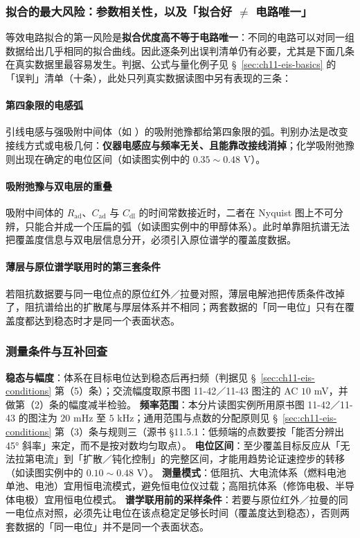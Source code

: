\subsubsection{拟合的最大风险：参数相关性，以及「拟合好 $\neq$ 电路唯一」}

等效电路拟合的第一风险是\textbf{拟合优度高不等于电路唯一}：不同的电路可以对同一组数据给出几乎相同的拟合曲线。因此逐条列出误判清单仍有必要，尤其是下面几条在真实数据里最容易发生。判据、公式与量化例子见 §~\ref{sec:ch11-eis-basics} 的「误判」清单（十条），此处只列真实数据读图中另有表现的三条：

\paragraph{第四象限的电感弧}引线电感与强吸附中间体（如 ）的吸附弛豫都给第四象限的弧。判别办法是改变接线方式或电极几何：\textbf{仪器电感应与频率无关、且能靠改接线消掉}；化学吸附弛豫则出现在确定的电位区间（如读图实例中的 $0.35\sim0.48$ V）。
\paragraph{吸附弛豫与双电层的重叠}吸附中间体的 $R_{\mathrm{ad}}$、$C_{\mathrm{ad}}$ 与 $C_{\mathrm{dl}}$ 的时间常数接近时，二者在 Nyquist 图上不可分辨，只能合并成一个压扁的弧（如读图实例中的甲醇体系）。此时单靠阻抗谱无法把覆盖度信息与双电层信息分开，必须引入原位谱学的覆盖度数据。
\paragraph{薄层与原位谱学联用时的第三套条件}若阻抗数据要与同一电位点的原位红外／拉曼对照，薄层电解池把传质条件改掉了，阻抗谱给出的扩散尾与厚层体系并不相同；两套数据的「同一电位」只有在覆盖度都达到稳态时才是同一个表面状态。

\subsubsection{测量条件与互补回查}

\begin{measure}
 \textbf{稳态与幅度}：体系在目标电位达到稳态后再扫频（判据见 §~\ref{sec:ch11-eis-conditions} 第（5）条）；交流幅度取原书图 11-42／11-43 图注的 AC $10$ mV，并做第（2）条的幅度减半检验。
 \textbf{频率范围}：本分片读图实例所用原书图 11-42／11-43 的图注为 $20$ mHz 至 $5$ kHz；通用范围与点数的分配原则见 §~\ref{sec:ch11-eis-conditions} 第（3）条与规则三（源书 §11.5.1：低频端的点数要按「能否分辨出 45° 斜率」来定，而不是按对数均匀取点）。
 \textbf{电位区间}：至少覆盖目标反应从「无法拉第电流」到「扩散／钝化控制」的完整区间，才能用趋势论证速控步的转移（如读图实例中的 $0.10\sim0.48$ V）。
 \textbf{测量模式}：低阻抗、大电流体系（燃料电池单池、电池）宜用恒电流模式，避免恒电位仪过载；高阻抗体系（修饰电极、半导体电极）宜用恒电位模式。
 \textbf{谱学联用前的采样条件}：若要与原位红外／拉曼的同一电位点对照，必须先让电位在该点稳定足够长时间（覆盖度达到稳态），否则两套数据的「同一电位」并不是同一个表面状态。
\end{measure}

